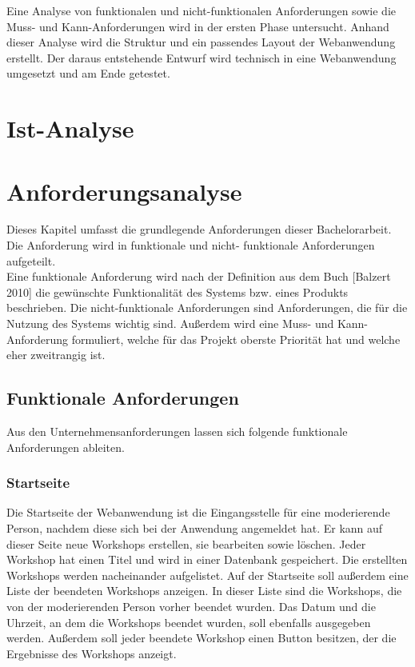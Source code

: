 \newpage
Eine Analyse von funktionalen und nicht-funktionalen Anforderungen sowie die Muss- und Kann-Anforderungen wird in der ersten Phase untersucht. Anhand dieser Analyse wird die Struktur und ein passendes Layout der Webanwendung erstellt. Der daraus entstehende Entwurf wird technisch in eine Webanwendung umgesetzt und am Ende getestet.

\section{Ist-Analyse}
\label{sec:ist-analyse}



\section{Anforderungsanalyse}
\label{sec:anforderungsanalyse}
Dieses Kapitel umfasst die grundlegende Anforderungen dieser Bachelorarbeit. Die Anforderung wird in funktionale und nicht- funktionale Anforderungen aufgeteilt. 
\\

Eine funktionale Anforderung wird nach der Definition aus dem Buch [Balzert 2010] die gewünschte Funktionalität des Systems bzw. eines Produkts beschrieben. 
Die nicht-funktionale Anforderungen sind Anforderungen, die für die Nutzung des Systems wichtig sind. Außerdem wird eine Muss- und Kann-Anforderung formuliert, welche für das Projekt oberste Priorität hat und welche eher zweitrangig ist.

\subsection{Funktionale Anforderungen}
\label{sec:funktionale anforderungen}
\label{sec:funktionale anforderungen}
Aus den Unternehmensanforderungen lassen sich folgende funktionale Anforderungen ableiten.

\subsubsection*{Startseite}
Die Startseite der Webanwendung ist die Eingangsstelle für eine moderierende Person, nachdem diese sich bei der Anwendung angemeldet hat. Er kann auf dieser Seite neue Workshops erstellen, sie bearbeiten sowie löschen. Jeder Workshop hat einen Titel und wird in einer Datenbank gespeichert. Die erstellten Workshops werden nacheinander aufgelistet. Auf der Startseite soll außerdem eine Liste der beendeten Workshops anzeigen. In dieser Liste sind die Workshops, die von der moderierenden Person vorher beendet wurden. Das Datum und die Uhrzeit, an dem die Workshops beendet wurden, soll ebenfalls ausgegeben werden. Außerdem soll jeder beendete Workshop einen Button besitzen, der die Ergebnisse des Workshops anzeigt. 

